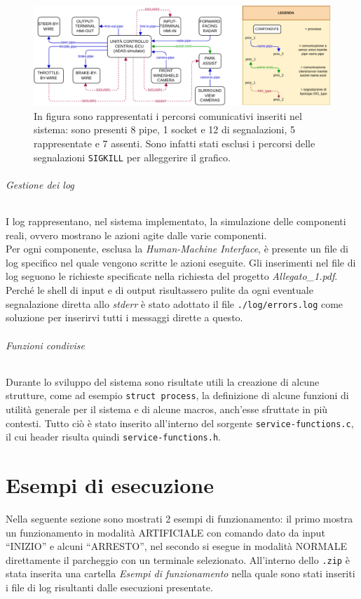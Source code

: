 \documentclass[11pt, openany]{article}
\theoremstyle{definition}
\theoremstyle{plain}
\theoremstyle{remark}
\begin{document}
			\begin{figure}[t]
				\includegraphics[scale=0.9, center]{./include/SO_Progetto_Diagrammi-Comunicazione.pdf}
				\caption{In figura sono rappresentati i percorsi comunicativi inseriti nel sistema: sono presenti 8 pipe, 1 socket e 12 di segnalazioni, 5 rappresentate e 7 assenti. Sono infatti stati esclusi i percorsi delle segnalazioni \texttt{SIGKILL} per alleggerire il grafico.}
				\label{fig:comunicazione}
			\end{figure}
			\normalsize
		\paragraph{Gestione dei log}
			I log rappresentano, nel sistema implementato, la simulazione delle componenti reali, ovvero mostrano le azioni agite dalle varie componenti.\\
			Per ogni componente, esclusa la \textit{Human-Machine Interface}, è presente un file di log specifico nel quale vengono scritte le azioni eseguite.
			Gli inserimenti nel file di log seguono le richieste specificate nella richiesta del progetto \textit{Allegato\_1.pdf}.
			Perché le shell di input e di output risultassero pulite da ogni eventuale segnalazione diretta allo \textit{stderr} è stato adottato il file \texttt{./log/errors.log} come soluzione per inserirvi tutti i messaggi dirette a questo.

		\paragraph{Funzioni condivise}
			Durante lo sviluppo del sistema sono risultate utili la creazione di alcune strutture, come ad esempio \texttt{struct process}, la definizione di alcune funzioni di utilità generale per il sistema e di alcune macros, anch'esse sfruttate in più contesti. Tutto ciò è stato inserito all'interno del sorgente \texttt{service-functions.c}, il cui header risulta quindi \texttt{service-functions.h}.

	\part{Esempi di esecuzione}
		Nella seguente sezione sono mostrati 2 esempi di funzionamento: il primo mostra un funzionamento in modalità ARTIFICIALE con comando dato da input ``INIZIO'' e alcuni ``ARRESTO'', nel secondo si esegue in modalità NORMALE direttamente il parcheggio con un terminale selezionato. All'interno dello \texttt{.zip} è stata  inserita una cartella \textit{Esempi di funzionamento} nella quale sono stati inseriti i file di log risultanti dalle esecuzioni presentate.
\end{document}
